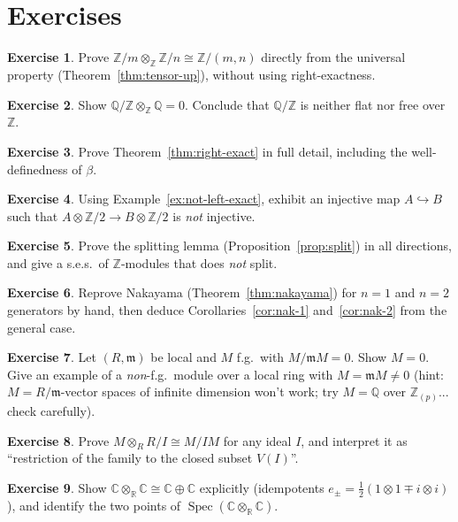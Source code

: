 \documentclass[11pt,a4paper]{article}
\theoremstyle{definition}
\newtheorem{exercise}{Exercise}
\newcommand{\Z}{\mathbb{Z}}
\newcommand{\Q}{\mathbb{Q}}
\newcommand{\R}{\mathbb{R}}
\newcommand{\C}{\mathbb{C}}
\newcommand{\m}{\mathfrak{m}}
\newcommand{\Spec}{\operatorname{Spec}}
\begin{document}
\section{Exercises}
\begin{exercise}
Prove $\Z/m\otimes_\Z\Z/n\cong\Z/(m,n)$ directly from the universal property
(Theorem~\ref{thm:tensor-up}), without using right-exactness.
\end{exercise}
\begin{exercise}
Show $\Q/\Z\otimes_\Z\Q=0$. Conclude that $\Q/\Z$ is neither flat nor free over $\Z$.
\end{exercise}
\begin{exercise}
Prove Theorem~\ref{thm:right-exact} in full detail, including the well-definedness of $\beta$.
\end{exercise}
\begin{exercise}
Using Example~\ref{ex:not-left-exact}, exhibit an injective map $A\hookrightarrow B$ such that
$A\otimes\Z/2\to B\otimes\Z/2$ is \emph{not} injective.
\end{exercise}
\begin{exercise}
Prove the splitting lemma (Proposition~\ref{prop:split}) in all directions, and give a s.e.s.\ of
$\Z$-modules that does \emph{not} split.
\end{exercise}
\begin{exercise}
Reprove Nakayama (Theorem~\ref{thm:nakayama}) for $n=1$ and $n=2$ generators by hand, then deduce
Corollaries~\ref{cor:nak-1} and~\ref{cor:nak-2} from the general case.
\end{exercise}
\begin{exercise}
Let $(R,\m)$ be local and $M$ f.g.\ with $M/\m M=0$. Show $M=0$. Give an example of a
\emph{non}-f.g.\ module over a local ring with $M=\m M\neq0$ (hint: $M=R/\m$-vector spaces of
infinite dimension won't work; try $M=\Q$ over $\Z_{(p)}$... check carefully).
\end{exercise}
\begin{exercise}
Prove $M\otimes_R R/I\cong M/IM$ for any ideal $I$, and interpret it as ``restriction of the family
to the closed subset $V(I)$''.
\end{exercise}
\begin{exercise}
Show $\C\otimes_\R\C\cong\C\oplus\C$ explicitly (idempotents $e_\pm=\frac12(1\otimes1\mp i\otimes i)$),
and identify the two points of $\Spec(\C\otimes_\R\C)$.
\end{exercise}
\end{document}
